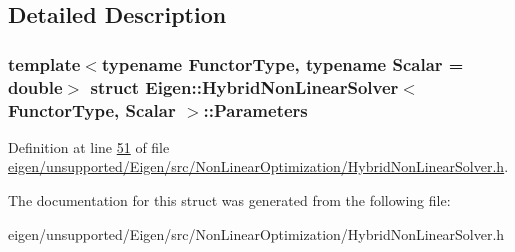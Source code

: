 \subsection{Detailed Description}
\subsubsection*{template$<$typename Functor\+Type, typename Scalar = double$>$\newline
struct Eigen\+::\+Hybrid\+Non\+Linear\+Solver$<$ Functor\+Type, Scalar $>$\+::\+Parameters}



Definition at line \hyperlink{eigen_2unsupported_2_eigen_2src_2_non_linear_optimization_2_hybrid_non_linear_solver_8h_source_l00051}{51} of file \hyperlink{eigen_2unsupported_2_eigen_2src_2_non_linear_optimization_2_hybrid_non_linear_solver_8h_source}{eigen/unsupported/\+Eigen/src/\+Non\+Linear\+Optimization/\+Hybrid\+Non\+Linear\+Solver.\+h}.



The documentation for this struct was generated from the following file\+:\begin{DoxyCompactItemize}
\item 
eigen/unsupported/\+Eigen/src/\+Non\+Linear\+Optimization/\+Hybrid\+Non\+Linear\+Solver.\+h\end{DoxyCompactItemize}
